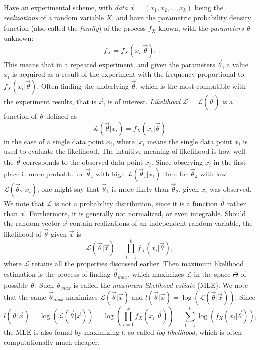 Have an experimental scheme, with \textit{data} $\vec{x} = (x_1, x_2, \dots , x_k)$ being the \textit{realizations} of a random variable $X$, and have the parametric probability density function (also called the \textit{family}) of the process $f_X$ known, with the \textit{parameters} $\vec{\theta}$ unknown:
\begin{equation}
    f_X = f_X(x_i|\vec{\theta}). \label{eq:stat_experiment}
\end{equation}
This means that in a repeated experiment, and given the parameters $\vec{\theta}$, a value $x_i$ is acquired as a result of the experiment with the frequency proportional to $f_X(x_i|\vec{\theta})$. Often finding the underlying $\vec{\theta}$, which is the most compatible with the experiment results, that is $\vec{x}$, is of interest. \textit{Likelihood} $\mathcal{L}=\mathcal{L}(\vec{\theta})$ is a function of $\vec{\theta}$ defined as 
\begin{equation}
    \mathcal{L}(\vec{\theta}|x_i) = f_X(x_i|\vec{\theta})
\end{equation}
in the case of a single data point $x_i$, where $|x_i$ means the single data point $x_i$ is used to evaluate the likelihood. The intuitive meaning of likelihood is how well the $\vec{\theta}$ corresponds to the observed data point $x_i$. Since observing $x_i$ in the first place is more probable for $\vec{\theta}_1$ with high $\mathcal{L}(\vec{\theta}_1|x_i)$ than for $\vec{\theta}_2$ with low $\mathcal{L}(\vec{\theta}_2|x_i)$, one might say that $\vec{\theta}_1$ is more likely than $\vec{\theta}_2$, given $x_i$ was observed. We note that $\mathcal{L}$ is not a probability distribution, since it is a function $\vec{\theta}$ rather than $\vec{x}$. Furthermore, it is generally not normalized, or even integrable. Should the random vector $\vec{x}$ contain realizations of an independent random variable, the likelihood of $\vec{\theta}$ given $\vec{x}$ is 
\begin{equation}
    \mathcal{L}(\vec{\theta}|\vec{x}) = \prod_{i=1}^k f_X(x_i|\vec{\theta}),
\end{equation}
where $\mathcal{L}$ retains all the properties discussed earlier. Then maximum likelihood estimation is the process of finding $\vec{\theta}_{max}$, which maximizes $\mathcal{L}$ in the space $\Theta$ of possible $\vec{\theta}$. Such $\vec{\theta}_{max}$ is called the \textit{maximum likelihood estiate} (MLE). We note that the same $\vec{\theta}_{max}$ maximizes $\mathcal{L}(\vec{\theta}|\vec{x})$ and $l(\vec{\theta}|\vec{x}) = \log \left( \mathcal{L}(\vec{\theta}|\vec{x}) \right)$. Since 
\begin{equation}
    l(\vec{\theta}|\vec{x}) = \log \left( \mathcal{L}(\vec{\theta}|\vec{x}) \right) = \log \left( \prod_{i=1}^k f_X(x_i|\vec{\theta}) \right) =  \sum_{i=1}^k \log \left( f_X(x_i|\vec{\theta}) \right),
\end{equation}
the MLE is also found by maximizing $l$, so called \textit{log-likelihood}, which is often computationally much cheaper. 


